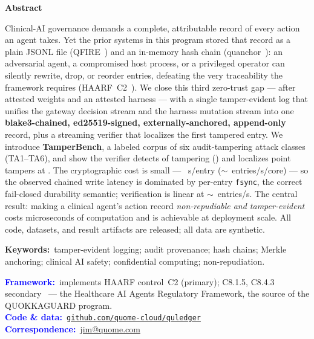 \documentclass[11pt]{article}
\begin{document}
\vspace{0.5em}
\begin{tcolorbox}[breakable, enhanced jigsaw, colback=black!4, colframe=black!4,
  arc=5pt, boxrule=0pt, left=16pt, right=16pt, top=10pt, bottom=10pt]
\setlength{\parskip}{0pt}
{\centering\large\bfseries Abstract\par}
\smallskip
\fontsize{9.5}{11.3}\selectfont
Clinical-AI governance demands a complete, attributable record of every action an
agent takes. Yet the prior systems in this program stored that record as a plain
JSONL file (QFIRE~\cite{schwoebel2026qfire}) and an in-memory hash chain
(quanchor~\cite{pristineweights2026}): an adversarial agent, a compromised host
process, or a privileged operator can silently rewrite, drop, or reorder entries,
defeating the very traceability the framework requires (HAARF~C2~\cite{schwoebel2026haarf}).
We close this third zero-trust gap --- after attested weights and an attested
harness --- with a single tamper-evident log that unifies the gateway decision
stream and the harness mutation stream into one \textbf{blake3-chained,
ed25519-signed, externally-anchored, append-only} record, plus a streaming verifier
that localizes the first tampered entry. We introduce \textbf{TamperBench}, a
labeled corpus of six audit-tampering attack classes (TA1--TA6), and show the
verifier detects \TDR{} of tampering (\TDRcount{}) and localizes point tampers at
\LOCrate{}. The cryptographic cost is small --- \ComputeUs~\textmu s/entry
($\sim$\ComputeThru~entries/s/core) --- so the observed chained write latency is
dominated by per-entry \texttt{fsync}, the correct fail-closed durability semantic;
verification is linear at $\sim$\VerifyThru~entries/s. The central result: making a
clinical agent's action record \emph{non-repudiable and tamper-evident} costs
microseconds of computation and is achievable at deployment scale. All code,
datasets, and result artifacts are released; all data are synthetic.

\medskip
\noindent\textbf{Keywords:}~tamper-evident logging; audit provenance; hash chains;
Merkle anchoring; clinical AI safety; confidential computing; non-repudiation.

\medskip
\noindent\textcolor{blue}{\textbf{Framework:}}~implements HAARF control~C2 (primary); C8.1.5, C8.4.3 secondary~\cite{schwoebel2026haarf} --- the Healthcare AI Agents Regulatory Framework, the source of the QUOKKAGUARD program.\\
\noindent\textcolor{blue}{\textbf{Code \& data:}}~\href{https://github.com/quome-cloud/quledger}{\texttt{github.com/quome-cloud/quledger}}\\
\noindent\textcolor{blue}{\textbf{Correspondence:}}~\href{mailto:jim@quome.com}{jim@quome.com}
\end{tcolorbox}
\end{document}
